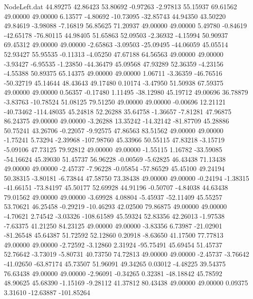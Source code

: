 \begin{filecontents}{NodeLeft.dat}
  44.89275   42.86423   53.80692    -0.97263   -2.97813   55.15937   69.61562   49.00000   49.00000    6.13577   -4.80692  -10.73095  -32.85743
  44.94350   43.50220   49.84619    -3.98088   -7.16819   56.85625   71.20937   49.00000   49.00000    5.49780   -0.84619  -42.65178  -76.80115
  44.98405   51.65863   52.09503    -2.36932   -4.15994   50.90937   69.45312   49.00000   49.00000   -2.65863   -3.09503  -25.09495  -44.06059
  45.05514   52.93427   55.95535    -0.11313   -4.05250   47.67188   64.56563   49.00000   49.00000   -3.93427   -6.95535   -1.23850  -44.36479
  45.09568   47.93289   52.36359    -4.23156   -4.55388   50.89375   65.14375   49.00000   49.00000    1.06711   -3.36359  -46.76516  -50.32719
  45.14644   48.43643   49.17480     0.10174   -3.47950   51.50938   67.59375   49.00000   49.00000    0.56357   -0.17480    1.11495  -38.12980
  45.19712   49.00696   36.78879    -3.83763  -10.78524   51.08125   79.51250   49.00000   49.00000   -0.00696   12.21121  -40.73462 -114.48035
  45.24818   52.26288   35.64758    -1.36657   -7.81281   47.96875   86.24375   49.00000   49.00000   -3.26288   13.35242  -14.32142  -81.87709
  45.28886   50.75241   43.26706    -0.22057   -9.92575   47.86563   83.51562   49.00000   49.00000   -1.75241    5.73294   -2.39968 -107.98760
  45.33966   50.55115   47.83218    -3.15719   -5.09106   47.73125   79.92812   49.00000   49.00000   -1.55115    1.16782  -33.59085  -54.16624
  45.39030   51.45737   56.96228    -0.00569   -5.62825   46.43438   71.13438   49.00000   49.00000   -2.45737   -7.96228   -0.05854  -57.86529
  45.45100   49.24194   50.38315    -3.80181   -6.73844   47.58750   73.38438   49.00000   49.00000   -0.24194   -1.38315  -41.66151  -73.84197
  45.50177   52.69928   44.91196    -0.50707   -4.84038   44.63438   79.01562   49.00000   49.00000   -3.69928    4.08804   -5.45937  -52.11409
  45.55257   53.70621   46.25458    -0.29219  -10.46293   42.02500   79.86875   49.00000   49.00000   -4.70621    2.74542   -3.03326 -108.61589
  45.59324   52.83356   42.26013    -1.97538   -7.63375   41.21250   84.23125   49.00000   49.00000   -3.83356    6.73987  -21.02901  -81.26548
  45.64387   51.72592   52.12860     0.20918   -8.63650   41.17500   77.77813   49.00000   49.00000   -2.72592   -3.12860    2.31924  -95.75491
  45.69454   51.45737   52.76642    -3.73019   -5.80731   40.73750   74.72813   49.00000   49.00000   -2.45737   -3.76642  -41.02650  -63.87174
  45.73507   51.96091   49.34265     0.03012   -4.48225   39.54375   76.63438   49.00000   49.00000   -2.96091   -0.34265    0.32381  -48.18842
  45.78592   48.90625   45.68390    -1.15169   -9.28112   41.37812   80.43438   49.00000   49.00000    0.09375    3.31610  -12.63887 -101.85264

\end{filecontents}
